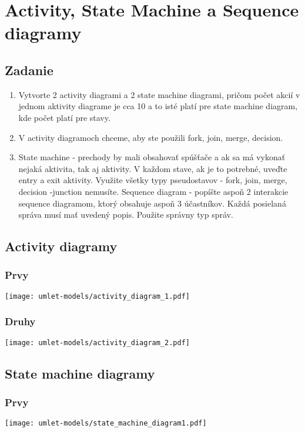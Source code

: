 \section{Activity, State Machine a Sequence diagramy}

\subsection{Zadanie}
\begin{enumerate} 
\item Vytvorte 2 activity diagrami a  2 state machine diagrami, pričom počet akcií v jednom aktivity diagrame je cca 10 a to isté platí pre state machine diagram, kde počet platí pre stavy.

\item V activity diagramoch chceme, aby ste použili fork, join, merge, decision.

\item State machine - prechody by mali obsahovať spúšťače a ak sa má vykonať nejaká aktivita, tak aj aktivity. V každom stave, ak je to potrebné, uveďte entry a exit aktivity. Využite všetky typy pseudostavov - fork, join, merge, decision -junction nemusíte.
Sequence diagram - popíšte aspoň 2 interakcie sequence diagramom, ktorý obsahuje aspoň 3 účastníkov. Každá posielaná správa musí mať uvedený popis. Použite správny typ správ.
\end{enumerate} 

\clearpage 
\subsection{Activity diagramy}
\subsubsection{Prvy}
\texttt{[image: umlet-models/activity\_diagram\_1.pdf]}
\subsubsection{Druhy}
\texttt{[image: umlet-models/activity\_diagram\_2.pdf]}

\clearpage 
\subsection{State machine diagramy} 
\subsubsection{Prvy}
\texttt{[image: umlet-models/state\_machine\_diagram1.pdf]}
